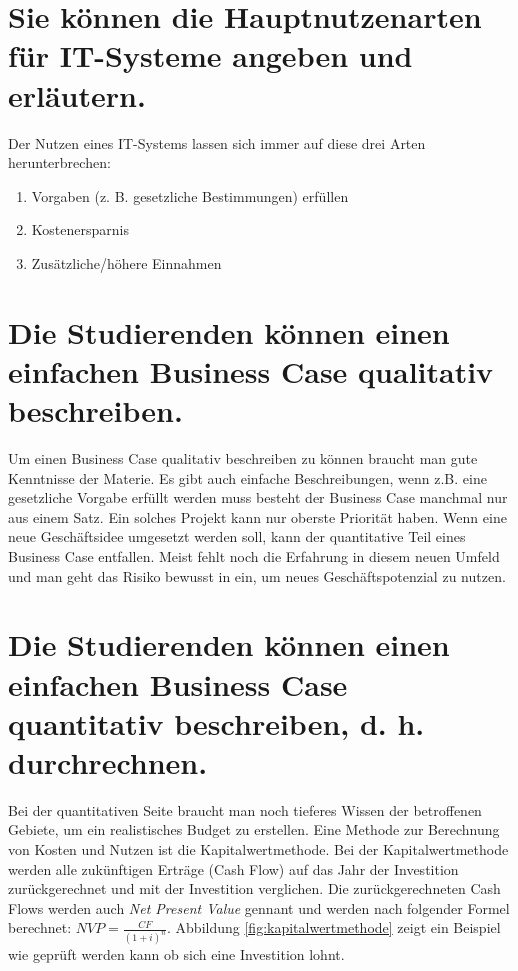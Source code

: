 \section{Sie können die Hauptnutzenarten für IT-Systeme angeben und erläutern.}

Der Nutzen eines IT-Systems lassen sich immer auf diese drei Arten herunterbrechen:
\begin{enumerate}
	\item Vorgaben (z. B. gesetzliche Bestimmungen) erfüllen
	\item Kostenersparnis
    \item Zusätzliche/höhere Einnahmen
\end{enumerate}

\section{Die Studierenden können einen einfachen Business Case qualitativ beschreiben.}

Um einen Business Case qualitativ beschreiben zu können braucht man gute Kenntnisse der Materie. Es gibt auch einfache Beschreibungen, wenn z.B. eine gesetzliche Vorgabe erfüllt werden muss besteht der Business Case manchmal nur aus einem Satz. Ein solches Projekt kann nur oberste Priorität haben.
Wenn eine neue Geschäftsidee umgesetzt werden soll, kann der quantitative Teil eines Business Case entfallen. Meist fehlt noch die Erfahrung in diesem neuen Umfeld und man geht das Risiko bewusst in ein, um neues Geschäftspotenzial zu nutzen.

\section{Die Studierenden können einen einfachen Business Case quantitativ beschreiben, d. h. durchrechnen.}

Bei der quantitativen Seite braucht man noch tieferes Wissen der betroffenen Gebiete, um ein realistisches Budget zu erstellen. Eine Methode zur Berechnung von Kosten und Nutzen ist die Kapitalwertmethode. Bei der Kapitalwertmethode werden alle zukünftigen Erträge (Cash Flow) auf das Jahr der Investition zurückgerechnet und mit der Investition verglichen. Die zurückgerechneten Cash Flows werden auch \emph{Net Present Value} gennant und werden nach folgender Formel berechnet: $NVP=\frac{CF}{(1+i)^n}$. Abbildung \ref{fig:kapitalwertmethode} zeigt ein Beispiel wie geprüft werden kann ob sich eine Investition lohnt.

